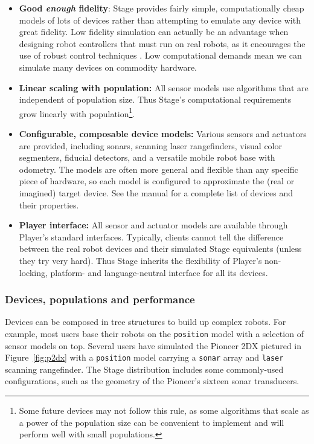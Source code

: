 \documentclass[a4paper]{ICAR2003}
\begin{document}
\begin{itemize}
\item {\bf Good {\em enough} fidelity}: Stage provides fairly simple,
  computationally cheap models of lots of devices rather than
  attempting to emulate any device with great fidelity. Low fidelity
  simulation can actually be an advantage when designing robot
  controllers that must run on real robots, as it encourages the
  use of robust control techniques \cite{Jakobi:ab97}.  Low
  computational demands mean we can simulate many devices on commodity
  hardware.
  
\item {\bf Linear scaling with population:} All sensor models use
  algorithms that are independent of population size. Thus Stage's
  computational requirements grow linearly with
  population\footnote{Some future devices may not follow this rule, as
    some algorithms that scale as a power of the population size can
    be convenient to implement and will perform well with small
    populations.}.
  
\item {\bf Configurable, composable device models:} Various sensors
  and actuators are provided, including sonars, scanning laser
  rangefinders, visual color segmenters, fiducial detectors, and
  a versatile mobile robot base with odometry.  The models are often
  more general and flexible than any specific piece of hardware, so
  each model is configured to approximate the (real or imagined)
  target device. See the manual \cite{stagemanual} for a complete list
  of devices and their properties.
    
\item {\bf Player interface:} All sensor and actuator models are
  available through Player's standard interfaces. Typically, clients
  cannot tell the difference between the real robot devices and their
  simulated Stage equivalents (unless they try very hard).  Thus Stage
  inherits the flexibility of Player's non-locking, platform- and
  language-neutral interface for all its devices.

\end{itemize}

\subsubsection{Devices, populations and performance}
Devices can be composed in tree structures to build up complex robots.
For example, most users base their robots on the {\tt position} model
with a selection of sensor models on top. Several users \cite{HowardMataricSukhatme03,JungSukhatme02,MakarenkoWilliamsBourgault02,Vaughan02:LOST-tra}
have simulated the Pioneer 2DX pictured in Figure~\ref{fig:p2dx} with
a {\tt position} model carrying a {\tt sonar} array and {\tt laser}
scanning rangefinder. The Stage distribution includes some
commonly-used configurations, such as the geometry of the
Pioneer's sixteen sonar transducers.
\end{document}
